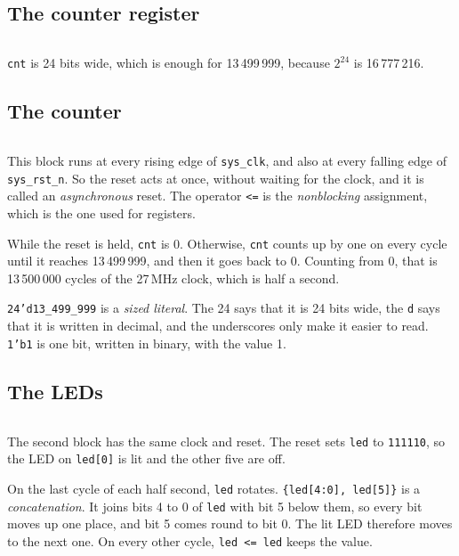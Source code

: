 \documentclass[11pt,a4paper]{article}
\begin{document}
\subsection*{The counter register}

\inputminted[firstline=7, lastline=8]{verilog}{../ide/led/src/led.v}

\texttt{cnt} is 24 bits wide, which is enough for 13\,499\,999, because $2^{24}$ is 16\,777\,216.

\subsection*{The counter}

\inputminted[firstline=10, lastline=18]{verilog}{../ide/led/src/led.v}

This block runs at every rising edge of \texttt{sys\_clk}, and also at every falling edge of \texttt{sys\_rst\_n}. So the reset acts at once, without waiting for the clock, and it is called an \emph{asynchronous} reset. The operator \texttt{<=} is the \emph{nonblocking} assignment, which is the one used for registers.

While the reset is held, \texttt{cnt} is 0. Otherwise, \texttt{cnt} counts up by one on every cycle until it reaches 13\,499\,999, and then it goes back to 0. Counting from 0, that is 13\,500\,000 cycles of the 27\,MHz clock, which is half a second.

\texttt{24'd13\_499\_999} is a \emph{sized literal}. The 24 says that it is 24 bits wide, the \texttt{d} says that it is written in decimal, and the underscores only make it easier to read. \texttt{1'b1} is one bit, written in binary, with the value 1.

\subsection*{The LEDs}

\inputminted[firstline=20, lastline=28]{verilog}{../ide/led/src/led.v}

The second block has the same clock and reset. The reset sets \texttt{led} to \texttt{111110}, so the LED on \texttt{led[0]} is lit and the other five are off.

On the last cycle of each half second, \texttt{led} rotates. \texttt{\{led[4:0], led[5]\}} is a \emph{concatenation}. It joins bits 4 to 0 of \texttt{led} with bit 5 below them, so every bit moves up one place, and bit 5 comes round to bit 0. The lit LED therefore moves to the next one. On every other cycle, \texttt{led <= led} keeps the value.
\end{document}
